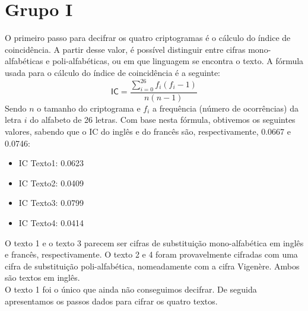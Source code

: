 \chapter{Grupo I}
O primeiro passo para decifrar os quatro criptogramas é o cálculo do índice de coincidência. A partir desse valor, é possível distinguir entre cifras mono-alfabéticas e poli-alfabéticas, ou em que linguagem se encontra o texto. A fórmula usada para o cálculo do índice de coincidência é a seguinte:
\begin{equation*}
\mathsf{IC} = \dfrac{\sum_{i=0}^{26}{f_i (f_i - 1)}}{n (n - 1)}
\end{equation*}
Sendo $n$ o tamanho do criptograma e $f_i$ a frequência (número de ocorrências) da letra $i$ do alfabeto de 26 letras. Com base nesta fórmula, obtivemos os seguintes valores, sabendo que o \textsf{IC} do inglês e do francês são, respectivamente, 0.0667 e 0.0746:
\begin{itemize}
  \item IC Texto1: 0.0623
  \item IC Texto2: 0.0409
  \item IC Texto3: 0.0799
  \item IC Texto4: 0.0414
\end{itemize}
O texto 1 e o texto 3 parecem ser cifras de substituição mono-alfabética em inglês e francês, respectivamente. O texto 2 e 4 foram provavelmente cifradas com uma cifra de substituição poli-alfabética, nomeadamente com a cifra Vigenère. Ambos são textos em inglês.\\
O texto 1 foi o único que ainda não conseguimos decifrar. De seguida apresentamos os passos dados para cifrar os quatro textos.
